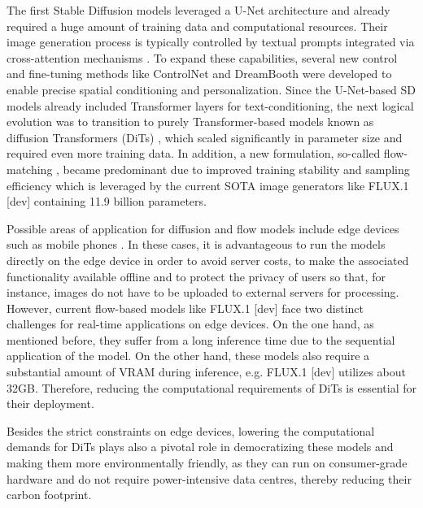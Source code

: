   The first Stable Diffusion models \cite{SD21,SDXL} leveraged a U-Net architecture \cite{Unet} and already required a huge amount of training data and computational resources. Their image generation process is typically controlled by textual prompts integrated via cross-attention mechanisms \cite{AttentionIsAllYouNeed}. To expand these capabilities, several new control and fine-tuning methods like ControlNet \cite{ControlNet} and DreamBooth \cite{ruiz2023dreamboothfinetuningtexttoimage} were developed to enable precise spatial conditioning and personalization. Since the U-Net-based SD models already included Transformer layers \cite{AttentionIsAllYouNeed} for text-conditioning, the next logical evolution was to transition to purely Transformer-based models known as diffusion Transformers (\gls{DiT}s) \cite{DiT}, which scaled significantly in parameter size and required even more training data. In addition, a new formulation, so-called flow-matching \cite{FlowMatching,RectifiedFlowMatching}, became predominant due to improved training stability and sampling efficiency which is leveraged by the current SOTA image generators like FLUX.1 [dev] \cite{Flux} containing 11.9 billion parameters.
  
  Possible areas of application for diffusion and flow models include edge devices such as mobile phones \cite{li2023snapfusion,chen2023speed,zhao2024mobilediffusion}. In these cases, it is advantageous to run the models directly on the edge device in order to avoid server costs, to make the associated functionality available offline and to protect the privacy of users so that, for instance, images do not have to be uploaded to external servers for processing.
  However, current flow-based models like FLUX.1 [dev] face two distinct challenges for real-time applications on edge devices. On the one hand, as mentioned before, they suffer from a long inference time due to the sequential application of the model. On the other hand, these models also require a substantial amount of \gls{VRAM} during inference, e.g. FLUX.1 [dev] utilizes about 32GB. Therefore, reducing the computational requirements of \gls{DiT}s is essential for their deployment.
 
  
  Besides the strict constraints on edge devices, lowering the computational demands for \gls{DiT}s plays also a pivotal role in democratizing these models and making them more environmentally friendly, as they can run on consumer-grade hardware and do not require power-intensive data centres, thereby reducing their carbon footprint. 

